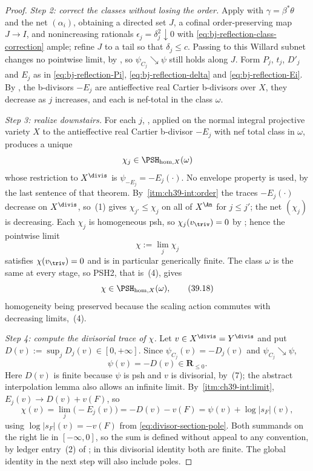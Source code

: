 \begin{proof}
\medskip
\noindent\emph{Step 2: correct the classes without losing the order.}
Apply  with $\gamma=\beta^*\theta$ and the net
$(\alpha_i)$, obtaining a directed set $J$, a cofinal order-preserving
map $J\to I$, and nonincreasing rationals
$\epsilon_j=\delta_j^2\downarrow0$ with
\eqref{eq:bj-reflection-class-correction} ample; refine $J$ to a tail so
that $\delta_j\le c$.  Passing to this Willard subnet changes no pointwise
limit, by , so
$\psi_{C_j}\searrow\psi$ still holds along $J$.  Form
$P_j$, $t_j$, $D'_j$ and $E_j$ as in \eqref{eq:bj-reflection-Pi},
\eqref{eq:bj-reflection-delta} and \eqref{eq:bj-reflection-Ei}.  By
, the b-divisors $-E_j$ are antieffective
real Cartier b-divisors over $X$, they decrease as $j$ increases, and
each is nef-total in the class $\omega$.

\medskip
\noindent\emph{Step 3: realize downstairs.}
For each $j$, , applied on the
normal integral projective variety $X$ to the antieffective real Cartier
b-divisor $-E_j$ with nef total class in $\omega$, produces a unique
\[
 \chi_j\in\PSH_{\mathrm{hom},X}(\omega)
\]
whose restriction to $X^{\divis}$ is $\psi_{-E_j}=-E_j(\cdot)$.  No
envelope property is used, by the last sentence of that theorem.  By
\,\cref{itm:ch39-int:order} the traces
$-E_j(\cdot)$ decrease on $X^{\divis}$, so
\,(1) gives
$\chi_{j'}\le\chi_j$ on all of $X^{\An}$ for $j\le j'$; the net
$(\chi_j)$ is decreasing.  Each $\chi_j$ is homogeneous psh, so
$\chi_j(v_{\triv})=0$ by
; hence the pointwise limit
\[
                    \chi:=\lim_j\chi_j
\]
satisfies $\chi(v_{\triv})=0$ and is in particular generically finite.
The class $\omega$ is the same at every stage, so PSH2, that is
\,(4), gives
\[
                    \chi\in\PSH_{\mathrm{hom},X}(\omega),
\tag{39.18}\label{eq:bj-reflection-chi}
\]
homogeneity being preserved because the scaling action commutes with
decreasing limits, \,(4).

\medskip
\noindent\emph{Step 4: compute the divisorial trace of $\chi$.}
Let $v\in X^{\divis}=Y^{\divis}$ and put $D(v):=\sup_jD_j(v)\in[0,+\infty]$.
Since $\psi_{C_j}(v)=-D_j(v)$ and $\psi_{C_j}\searrow\psi$,
\[
                    \psi(v)=-D(v)\in\mathbf R_{\le0}.
\]
Here $D(v)$ is finite because $\psi$ is psh and $v$ is divisorial,
by \,(7); the abstract interpolation lemma
also allows an infinite limit.
By \,\cref{itm:ch39-int:limit},
$E_j(v)\to D(v)+v(F)$, so
\[
 \chi(v)=\lim_j\bigl(-E_j(v)\bigr)=-D(v)-v(F)
       =\psi(v)+\log|s_F|(v),
\tag{39.19}\label{eq:bj-reflection-divisorial-identity}
\]
using $\log|s_F|(v)=-v(F)$ from \eqref{eq:divisor-section-pole}.  Both
summands on the right lie in $[-\infty,0]$, so the sum is defined without
appeal to any convention, by ledger entry~(2) of
; in this divisorial identity both are
finite.  The global identity in the next step will also include poles.


\end{proof}
